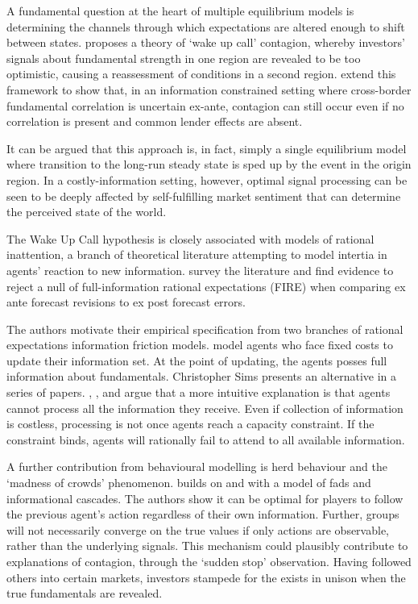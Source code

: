 \documentclass[../base.tex]{subfiles}
\begin{document}


A fundamental question at the heart of multiple equilibrium models is determining the channels through which expectations are altered enough to shift between states. \cite{goldstein1998asian} proposes a theory of `wake up call' contagion, whereby investors' signals about fundamental strength in one region are revealed to be too optimistic, causing a reassessment of conditions in a second region. \cite{ahnert2015wake} extend this framework to show that, in an information constrained setting where cross-border fundamental correlation is uncertain ex-ante, contagion can still occur even if no correlation is present and common lender effects are absent. 

It can be argued that this approach is, in fact, simply a single equilibrium model where transition to the long-run steady state is sped up by the event in the origin region. In a costly-information setting, however, optimal signal processing can be seen to be deeply affected by self-fulfilling market sentiment that can determine the perceived state of the world.

The Wake Up Call hypothesis is closely associated with models of rational inattention, a branch of theoretical literature attempting to model intertia in agents' reaction to new information.  \cite{coibion2010information} survey the literature and find evidence to reject a null of full-information rational expectations (FIRE) when comparing ex ante forecast revisions to ex post forecast errors. 

The authors motivate their empirical specification from two branches of rational expectations information friction models. \cite{NBERw8290} model agents who face fixed costs to update their information set. At the point of updating, the agents posses full information about fundamentals. Christopher Sims presents an alternative in a series of papers. \cite{sims1998stickiness}, \cite{sims2003implications}, and \cite{sims2006rational} argue that a more intuitive explanation is that agents cannot process all the information they receive. Even if collection of information is costless, processing is not once agents reach a capacity constraint. If the constraint binds, agents will rationally fail to attend to all available information. 

A further contribution from behavioural modelling is herd behaviour and the `madness of crowds' phenomenon. \cite{bikhchandani1998learning} builds on \cite{bikhchandani1992theory} and \cite{banerjee1992simple} with a model of fads and informational cascades. The authors show it can be optimal for players to follow the previous agent's action regardless of their own information. Further, groups will not necessarily converge on the true values if only actions are observable, rather than the underlying signals. This mechanism could plausibly contribute to explanations of contagion, through the  \cite{kaminsky2003unholy} `sudden stop' observation. Having followed others into certain markets, investors stampede for the exists in unison when the true fundamentals are revealed.
\end{document}
